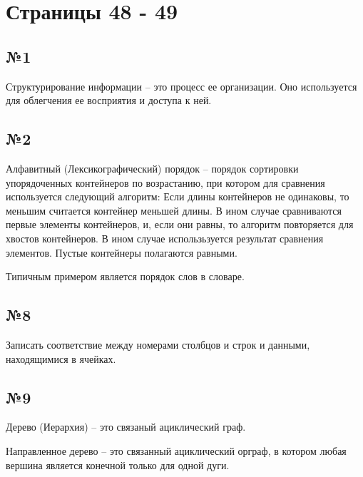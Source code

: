 \section{Страницы 48 - 49}
\subsection{№1}
Структурирование информации -- это процесс ее организации.
Оно используется для облегчения ее восприятия и доступа к ней.

\subsection{№2}
Алфавитный (Лексикографический) порядок -- порядок сортировки упорядоченных 
контейнеров по возрастанию, при котором для сравнения используется следующий
алгоритм: Если длины контейнеров не одинаковы, то меньшим считается контейнер 
меньшей длины. В ином случае сравниваются первые элементы контейнеров, и, если 
они равны, то алгоритм повторяется для хвостов контейнеров. В ином случае 
использьзуется результат сравнения элементов. Пустые контейнеры полагаются 
равными.

Типичным примером является порядок слов в словаре.

\subsection{№8}
Записать соответствие между номерами столбцов и строк и данными, находящимися
в ячейках.

\subsection{№9}
Дерево (Иерархия) -- это связаный ациклический граф.

Направленное дерево -- это связанный ациклический орграф, в котором любая вершина 
является конечной только для одной дуги.
